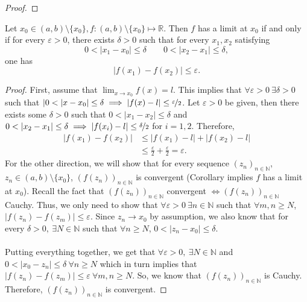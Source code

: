 \documentclass{article}
\newcommand{\R}{\mathbb{R}}
\newcommand{\N}{\mathbb{N}}
\newcommand{\seq}[2]{(#1_{#2})_{#2 \in \N}}
\newcommand{\?}{\stackrel{?}{=}}
\theoremstyle{definition} %
\begin{document}
\begin{itemize}
\begin{proof}
          \end{proof}
          \begin{lemma}
              Let $x_0 \in (a, b) \setminus \{x_0\}, f: (a, b) \setminus \{x_0\} \mapsto \R$. Then $f$ has a limit at $x_0$ if and only if for every $\varepsilon > 0$, there exists $\delta > 0$ such that for every $x_1, x_2$ satisfying
              $$0 < |x_1 - x_0| \leq \delta \qquad 0 < |x_2 - x_1| \leq \delta,$$
              one has
              $$|f(x_1) - f(x_2)| \leq \varepsilon.$$
              \label{lemma:cauchy_crit}
          \end{lemma}
          \begin{proof}
              First, assume that $\lim_{x \to x_0} f(x) = l$. This implies that $\forall \varepsilon > 0 \ \exists \delta > 0$ such that $|0 < |x - x_0| \leq \delta \implies |f(x) - l| \leq \nicefrac{\varepsilon}{2}$. Let $\varepsilon > 0$ be given, then there exists some $\delta > 0$ such that $0 < |x_1 - x_2| \leq \delta$ and $0 < |x_2 - x_1| \leq \delta \implies |f(x_i) - l| \leq \nicefrac{\delta}{2}$ for $i = 1, 2$. Therefore,
              \begin{align*}
                  |f(x_1) - f(x_2)| & \leq |f(x_1) - l| + |f(x_2) - l|                                  \\
                                    & \leq \frac{\varepsilon}{2} + \frac{\varepsilon}{2} = \varepsilon.
              \end{align*}
              For the other direction, we will show that for every sequence $\seq{z}{n}$, $z_n \in (a, b) \setminus \{x_0\}$, $(f(z_n))_{n \in \N}$ is convergent (Corollary implies $f$ has a limit at $x_0$). Recall the fact that $(f(z_n))_{n \in \N}$ convergent $\iff (f(z_n))_{n \in \N}$ Cauchy. Thus, we only need to show that $\forall \varepsilon > 0 \ \exists n \in \N$ such that $\forall m, n \geq N$, $|f(z_n) - f(z_m)| \leq \varepsilon$. Since $z_n \rightarrow x_0$ by assumption, we also know that for every $\delta > 0, \ \exists N \in \N$ such that $\forall n \geq N$, $0 < |z_n - x_0| \leq \delta$. \\\\
              Putting everything together, we get that $\forall \varepsilon > 0, \ \exists N \in \N$ and $0 < |x_0 - z_n| \leq \delta \ \forall n \geq N$ which in turn implies that $|f(z_n) - f(z_m)| \leq \varepsilon \ \forall m, n \geq N$. So, we know that $(f(z_n))_{n \in \N}$ is Cauchy. Therefore, $(f(z_n))_{n \in \N}$ is convergent.
          \end{proof}
\end{itemize}
\end{document}
